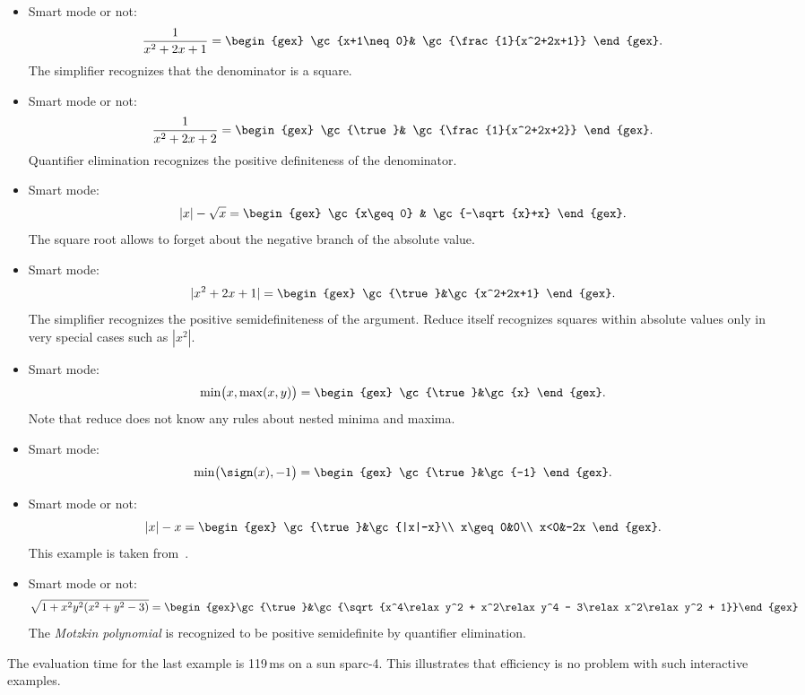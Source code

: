 \begin{itemize}
\item Smart mode or not:
$$
\frac{1}{x^2+2x+1}=\begin{gex}
\gc{x+1\neq0}& \gc{\frac{1}{x^2+2x+1}}
		   \end{gex}.
$$
The simplifier recognizes that the denominator is a square.
\item Smart mode or not:
$$
\frac{1}{x^2+2x+2}=\begin{gex}
\gc{\true}& \gc{\frac{1}{x^2+2x+2}}
		   \end{gex}.
$$
Quantifier elimination recognizes the positive definiteness of the
denominator.
\item Smart mode:
$$
|x|-\sqrt{x}=\begin{gex}
\gc{x\geq 0} & \gc{-\sqrt{x}+x}
	     \end{gex}.
$$
The square root allows to forget about the negative branch of the
absolute value.
\item Smart mode:
$$
|x^2+2x+1|=\begin{gex}
\gc{\true}&\gc{x^2+2x+1}
	   \end{gex}.
$$
The simplifier recognizes the positive semidefiniteness of
the argument. {\sc Reduce} itself recognizes squares within absolute values
only in very special cases such as $|x^2|$.
\item Smart mode:
$$
\min\bigl(x,\max(x,y)\bigr)=\begin{gex}
\gc{\true}&\gc{x}
		  \end{gex}.
$$
Note that {\sc reduce} does not know any rules about nested minima and
maxima.
\item
Smart mode:
$$
\min\bigl(\sign(x),-1\bigr)=\begin{gex}
\gc{\true}&\gc{-1}
		  \end{gex}.
$$
\item Smart mode or not:
$$
|x|-x=\begin{gex}
\gc{\true}&\gc{|x|-x}\\
x\geq0&0\\
x<0&-2x
      \end{gex}.
$$
This example is taken from~\cite{DavenportFaure:94}.
\item
Smart mode or not:
$$
\sqrt{1+x^2\relax y^2\relax
(x^2+y^2-3)}={}
\begin{gex}\gc{\true}&\gc{\sqrt{x^4\relax y^2 +
x^2\relax y^4 - 3\relax x^2\relax y^2 + 1}}\end{gex}
$$
The {\em Motzkin polynomial} is recognized to be positive semidefinite
by quantifier elimination.
\end{itemize}
The evaluation time for the last example is 119\,ms on a {\sc sun
sparc-4}. This illustrates that efficiency is no problem with such
interactive examples.
